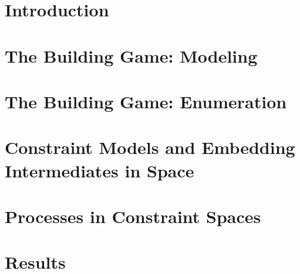 \documentclass[12pt,twoside]{report}  %
\begin{document}
\chapter{Introduction}

\clearpage{\pagestyle{empty}\cleardoublepage}

\chapter{The Building Game: Modeling}

\clearpage{\pagestyle{empty}\cleardoublepage}

\chapter{The Building Game: Enumeration}

\clearpage{\pagestyle{empty}\cleardoublepage}

\chapter{Constraint Models and Embedding Intermediates in Space}

\clearpage{\pagestyle{empty}\cleardoublepage}

\chapter{Processes in Constraint Spaces}

\clearpage{\pagestyle{empty}\cleardoublepage}

\chapter{Results}

\clearpage{\pagestyle{empty}\cleardoublepage}

%
%
%



\begin{spacing}{0.9}
  
\end{spacing}
\end{document}
